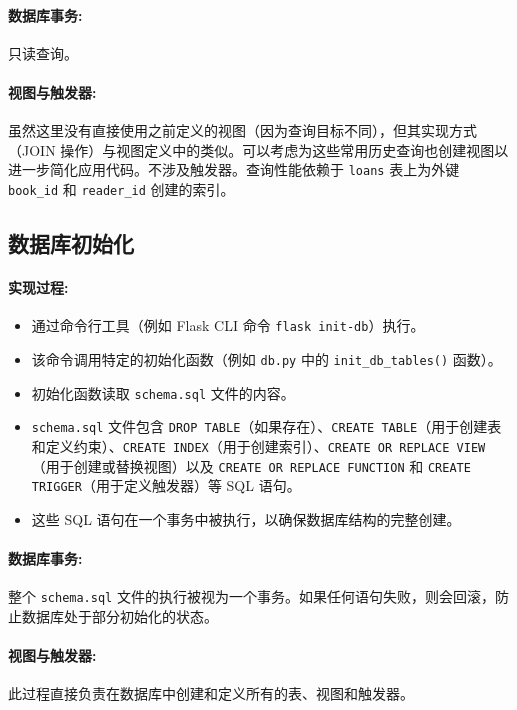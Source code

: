 \documentclass[11pt, a4paper]{article}
\begin{document}
\paragraph{数据库事务:}
只读查询。
\paragraph{视图与触发器:}
虽然这里没有直接使用之前定义的视图（因为查询目标不同），但其实现方式（JOIN 操作）与视图定义中的类似。可以考虑为这些常用历史查询也创建视图以进一步简化应用代码。不涉及触发器。查询性能依赖于 \texttt{loans} 表上为外键 \texttt{book\_id} 和 \texttt{reader\_id} 创建的索引。

\subsection{数据库初始化}
\paragraph{实现过程:}
\begin{itemize}
    \item 通过命令行工具（例如 Flask CLI 命令 \texttt{flask init-db}）执行。
    \item 该命令调用特定的初始化函数（例如 \texttt{db.py} 中的 \texttt{init\_db\_tables()} 函数）。
    \item 初始化函数读取 \texttt{schema.sql} 文件的内容。
    \item \texttt{schema.sql} 文件包含 \texttt{DROP TABLE}（如果存在）、\texttt{CREATE TABLE}（用于创建表和定义约束）、\texttt{CREATE INDEX}（用于创建索引）、\texttt{CREATE OR REPLACE VIEW}（用于创建或替换视图）以及 \texttt{CREATE OR REPLACE FUNCTION} 和 \texttt{CREATE TRIGGER}（用于定义触发器）等 SQL 语句。
    \item 这些 SQL 语句在一个事务中被执行，以确保数据库结构的完整创建。
\end{itemize}
\paragraph{数据库事务:}
整个 \texttt{schema.sql} 文件的执行被视为一个事务。如果任何语句失败，则会回滚，防止数据库处于部分初始化的状态。
\paragraph{视图与触发器:}
此过程直接负责在数据库中创建和定义所有的表、视图和触发器。

\end{document}
